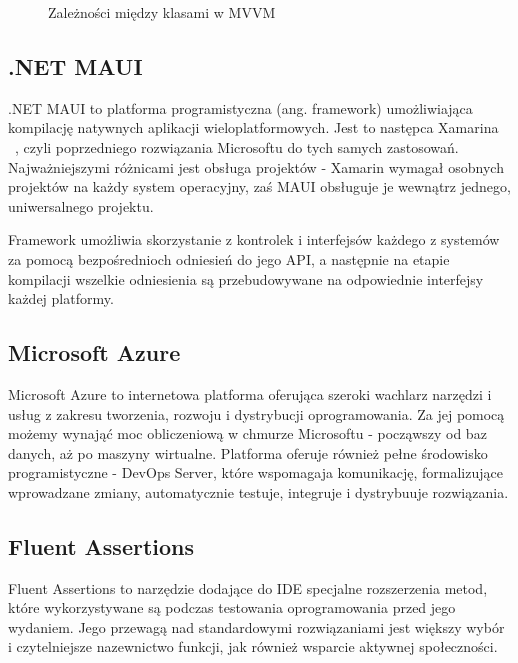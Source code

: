 \begin{figure}[!htp]
    \centering
    \caption{Zależności między klasami w MVVM~\cite{mvvm}}
    \label{fig:MVVM_diagram}
\end{figure}



\subsection{.NET MAUI}
.NET MAUI \cite{mauiDefinition} to platforma programistyczna (ang. framework) umożliwiająca
kompilację natywnych aplikacji wieloplatformowych. Jest to następca Xamarina ~\cite{xamarin},
czyli poprzedniego rozwiązania Microsoftu do tych samych zastosowań. Najważniejszymi różnicami
jest obsługa projektów - Xamarin wymagał osobnych projektów na każdy system operacyjny, zaś MAUI
obsługuje je wewnątrz jednego, uniwersalnego projektu.

Framework umożliwia skorzystanie z kontrolek i interfejsów każdego z systemów za pomocą 
bezpośrednioch odniesień do jego API, a następnie na etapie kompilacji wszelkie odniesienia są
przebudowywane na odpowiednie interfejsy każdej platformy.




\subsection{Microsoft Azure}
Microsoft Azure \cite{azure} to internetowa platforma oferująca szeroki wachlarz narzędzi i usług
z zakresu tworzenia, rozwoju i dystrybucji oprogramowania. Za jej pomocą możemy wynająć moc obliczeniową
w chmurze Microsoftu - począwszy od baz danych, aż po maszyny wirtualne. Platforma oferuje również
pełne środowisko programistyczne - DevOps Server, które wspomagaja komunikację, 
formalizujące wprowadzane zmiany, automatycznie testuje, integruje i dystrybuuje rozwiązania.

\subsection{Fluent Assertions}
Fluent Assertions \cite{fluentassertions} to narzędzie dodające do IDE specjalne rozszerzenia
metod, które wykorzystywane są podczas testowania oprogramowania przed jego wydaniem.
Jego przewagą nad standardowymi rozwiązaniami jest większy wybór i czytelniejsze
nazewnictwo funkcji, jak również wsparcie aktywnej społeczności.


